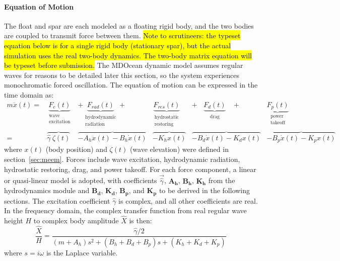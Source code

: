 \paragraph{Equation of Motion}
The float and spar are each modeled as a floating rigid body, and the two bodies are coupled to transmit force between them.
\hl{Note to scrutineers: the typeset equation below is for a single rigid body (stationary spar), but the actual simulation uses the real two-body dynamics.
The two-body matrix equation will be typeset before submission.} The MDOcean dynamic model assumes %
regular waves for reasons to be detailed later this section, so the system experiences monochromatic forced oscillation.
The equation of motion can be expressed in the time domain as: %
\setlength\arraycolsep{0pt}
\begin{equation}\label{eq:eom}
\begin{array}{rCCCCC}
     m\ddot{x}(t) = & \underbrace{F_{e}(t)}_{\substack{\textrm{wave} \\  \textrm{excitation} }} & +\underbrace{F_{rad}(t)}_{\substack{\text{hydrodynamic} \\ \text{radiation} }} +&  \underbrace{ F_{res}(t)}_{\substack{\textrm{hydrostatic} \\ \text{restoring} }} &  +~~~~\underbrace{F_{d}(t)}_{\substack{\textrm{drag} }}~~~~+ & \underbrace{F_{p}(t)}_{\substack{\textrm{power}\\\text{takeoff} }} \\
    = & \overbrace{\hat{\gamma}~ \zeta(t)} & \overbrace{-A_h\ddot{x}(t) - B_h\dot{x}(t)} &  \overbrace{-K_hx(t)} & \overbrace{-B_d\dot{x}(t)-K_dx(t)}  & \overbrace{-B_p\dot{x}(t)-K_px(t)}
\end{array}
\end{equation}
where $x(t)$ (body position) and $\zeta(t)$ (wave elevation) were defined in section~\ref{sec:meem}.
Forces include wave excitation, hydrodynamic radiation, hydrostatic restoring, drag, and power takeoff.
For each force component, a linear or quasi-linear model is adopted, with coefficients $\vec{\hat{\gamma}}$, $\mathbf{A_h}$, $\mathbf{B_h}$, $\mathbf{K_h}$ from the hydrodynamics module and $\mathbf{B_d}$, $\mathbf{K_d}$, $\mathbf{B_p}$, and $\mathbf{K_p}$ to be derived in the following sections.
The excitation coefficient $\hat{\gamma}$ is complex, and all other coefficients are real.
In the frequency domain, the complex transfer function from real regular wave height $H$ to complex body amplitude $\hat{X}$ is then:
\begin{equation}\label{eq:eom-freq-domain}
    \frac{\hat{X}}{H} = \frac{\hat{\gamma}/2}{(m+A_h)s^2+(B_h+B_d+B_p)s+(K_h+K_d+K_p)}
\end{equation}
where $s=i\omega$ is the Laplace variable.

